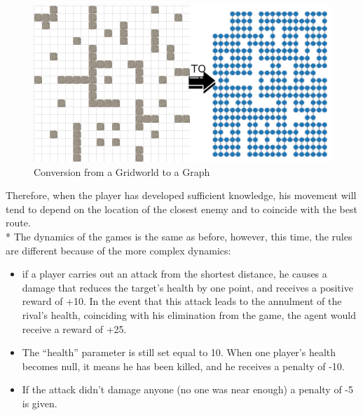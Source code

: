 \begin{figure}
	\centering 
	\includegraphics[width=\linewidth]{./figs/World2graph.png}
	\caption{Conversion from a Gridworld to a Graph}
	\vspace{-0.5cm}
	\label{fig:world2graph}
\end{figure}

Therefore, when the player has developed sufficient knowledge, his movement will tend to depend on the location of the closest enemy and to coincide with the best route.\\*
The dynamics of the games is the same as before, however, this time, the rules are different because of the more complex dynamics:

\begin{itemize}[noitemsep, topsep=0ex]
  \item if a player carries out an attack from the shortest distance, he causes a damage that reduces the target's health by one point, and receives a positive reward of +10. In the event that this attack leads to the annulment of the rival's health, coinciding with his elimination from the game, the agent would receive a reward of +25.
  \item The ``health'' parameter is still set equal to 10. When one player's health becomes null, it means he has been killed, and he receives a penalty of -10.
  \item If the attack didn't damage anyone (no one was near enough) a penalty of -5 is given.
\end{itemize}

